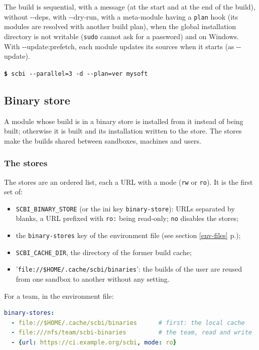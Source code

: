 \documentclass[a4paper,12pt,twoside]{article}
\newcommand{\code}[1]{\texttt{#1}}
\newcommand{\seeref}[1]{see section \ref{#1} p.\pageref{#1}}
\newcommand{\file}[1]{'{\texttt{#1}}'}
\newcommand{\cmd}[1]{\tabto{1cm}\hspace{0.5cm}\texttt{\textbf{\$} #1}}
\newcommand{\ddash}{-{}-}
\begin{document}
The build is sequential, with a message (at the start and at the end of the build), without \ddash{}deps, with \ddash{}dry-run, with a meta-module having a \code{plan} hook (its modules are resolved with another build plan), when the global installation directory is not writable (\code{sudo} cannot ask for a password) and on Windows. With \ddash{}update:prefetch, each module updates its sources when it starts (as \ddash{}update).

\cmd{scbi \ddash{}parallel=3 -d \ddash{}plan=ver mysoft}

\subsection{Binary store}
\label{binary-store}

A module whose build is in a binary store is installed from it instead of being built; otherwise it is built and its installation written to the store. The stores make the builds shared between sandboxes, machines and users.

\subsubsection{The stores}

The stores are an ordered list, each a URL with a mode (\code{rw} or \code{ro}). It is the first set of:
\begin{itemize}
	\item \code{SCBI\_BINARY\_STORE} (or the ini key \code{binary-store}): URLs separated by blanks, a URL prefixed with \code{ro:} being read-only; \code{no} disables the stores;
	\item the \code{binary-stores} key of the environment file (\seeref{env-files});
	\item \code{SCBI\_CACHE\_DIR}, the directory of the former build cache;
	\item \file{file://\$HOME/.cache/scbi/binaries}: the builds of the user are reused from one sandbox to another without any setting.
\end{itemize}

For a team, in the environment file:

\begin{lstlisting}[language={yaml}]
binary-stores:
  - file://$HOME/.cache/scbi/binaries      # first: the local cache
  - file:///nfs/team/scbi-binaries         # the team, read and write
  - {url: https://ci.example.org/scbi, mode: ro}
\end{lstlisting}
\end{document}
